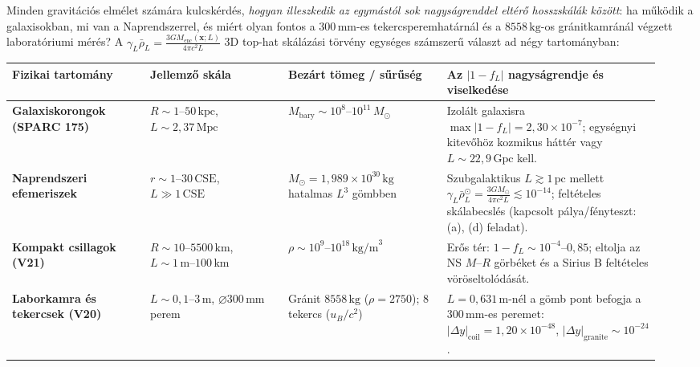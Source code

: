 \documentclass[10pt,a4paper]{article}
\begin{document}
\par
Minden gravit\'aci\'os elm\'elet sz\'am\'ara kulcsk\'erd\'es, \emph{hogyan illeszkedik az egym\'ast\'ol sok nagys\'agrenddel elt\'er\H{o} hosszsk\'al\'ak k\"oz\"ott}: ha m\H{u}k\"odik a galaxisokban, mi van a Naprendszerrel, \'es mi\'ert olyan fontos a $300\,\text{mm}$-es tekercsperemhat\'arn\'al \'es a $8558\,\text{kg}$-os gr\'anitkamr\'an\'al v\'egzett laborat\'oriumi m\'er\'es? A $\gamma_L \bar{\rho}_L = \frac{3 G M_{\text{enc}}(\mathbf{x};L)}{4\pi c^2 L}$ 3D top-hat sk\'al\'az\'asi t\"orv\'eny egys\'eges sz\'amszer\H{u} v\'alaszt ad n\'egy tartom\'anyban:
\begin{center}\vspace{-2pt}
{\footnotesize
\begin{tabular}{@{}>{\bfseries}p{0.20\linewidth}p{0.20\linewidth}p{0.23\linewidth}p{0.31\linewidth}@{}}
\toprule
Fizikai tartom\'any & Jellemz\H{o} sk\'ala & Bez\'art t\"omeg / s\H{u}r\H{u}s\'eg & Az $|1 - f_L|$ nagys\'agrendje \'es viselked\'ese \\
\midrule
Galaxiskorongok (SPARC 175) & $R \sim 1\text{--}50\,\text{kpc}$, $L \sim 2{,}37\,\text{Mpc}$ & $M_{\text{bary}} \sim 10^8\text{--}10^{11}\,M_\odot$ & Izol\'alt galaxisra $\max|1-f_L| = 2{,}30\times 10^{-7}$; egys\'egnyi kitev\H{o}h\"oz kozmikus h\'att\'er vagy $L\sim 22{,}9\,\text{Gpc}$ kell. \\
Naprendszeri efemeriszek & $r \sim 1\text{--}30\,\text{CSE}$, $L \gg 1\,\text{CSE}$ & $M_\odot = 1{,}989\times 10^{30}\,\text{kg}$ hatalmas $L^3$ g\"ombben & Szubgalaktikus $L \gtrsim 1\,\text{pc}$ mellett $\gamma_L\bar{\rho}_L^\odot = \frac{3GM_\odot}{4\pi c^2 L} \lesssim 10^{-14}$; felt\'eteles sk\'alabecsl\'es (kapcsolt p\'alya/f\'enyteszt: (a), (d) feladat). \\
Kompakt csillagok (V21) & $R \sim 10\text{--}5500\,\text{km}$, $L \sim 1\,\text{m}\text{--}100\,\text{km}$ & $\rho \sim 10^9\text{--}10^{18}\,\text{kg/m}^3$ & Er\H{o}s t\'er: $1-f_L \sim 10^{-4}\text{--}0{,}85$; eltolja az NS $M$--$R$ g\"orb\'eket \'es a Sirius B felt\'eteles v\"or\"oseltol\'od\'as\'at. \\
Laborkamra \'es tekercsek (V20) & $L \sim 0{,}1\text{--}3\,\text{m}$, $\varnothing 300\,\text{mm}$ perem & Gr\'anit $8558\,\text{kg}$ ($\rho=2750$); 8 tekercs ($u_B/c^2$) & $L=0{,}631\,\text{m}$-n\'el a g\"omb pont befogja a $300\,\text{mm}$-es peremet: $|\Delta y|_{\text{coil}}=1{,}20\times 10^{-48}$, $|\Delta y|_{\text{granite}}\sim 10^{-24}$. \\
\bottomrule
\end{tabular}}
\end{center}
\end{document}
